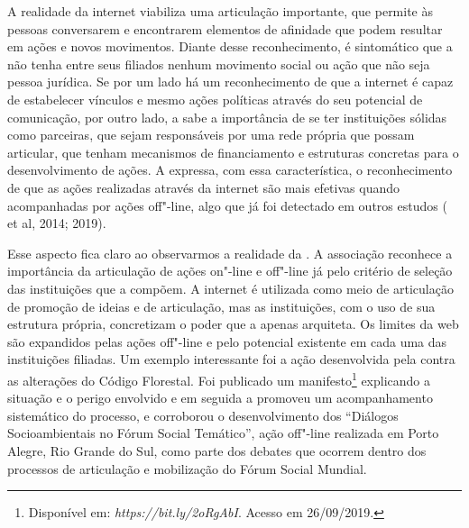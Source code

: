 A realidade da internet viabiliza uma articulação importante, que
permite às pessoas conversarem e encontrarem elementos de afinidade que
podem resultar em ações e novos movimentos. Diante desse reconhecimento,
é sintomático que a  não tenha entre seus filiados nenhum movimento
social ou ação que não seja pessoa jurídica. Se por um lado há um
reconhecimento de que a internet é capaz de estabelecer vínculos e mesmo
ações políticas através do seu potencial de comunicação, por outro lado,
a  sabe a importância de se ter instituições sólidas como
parceiras, que sejam responsáveis por uma rede própria que possam
articular, que tenham mecanismos de financiamento e estruturas concretas
para o desenvolvimento de ações. A  expressa, com essa
característica, o reconhecimento de que as ações realizadas através da
internet são mais efetivas quando acompanhadas por ações off"-line, algo
que já foi detectado em outros estudos ( et al, 2014; 2019).

Esse aspecto fica claro ao observarmos a realidade da . A
associação reconhece a importância da articulação de ações on"-line e
off"-line já pelo critério de seleção das instituições que a compõem. A
internet é utilizada como meio de articulação de promoção de ideias e de
articulação, mas as instituições, com o uso de sua estrutura própria,
concretizam o poder que a  apenas arquiteta. Os limites da web são
expandidos pelas ações off"-line e pelo potencial existente em cada uma
das instituições filiadas. Um exemplo interessante foi a ação
desenvolvida pela  contra as alterações do Código Florestal. Foi
publicado um manifesto\footnote{Disponível em:
  \emph{https://bit.ly/2oRgAbI}.
  Acesso em 26/09/2019.} explicando a situação e o perigo envolvido e em
seguida a  promoveu um acompanhamento sistemático do processo, e
corroborou o desenvolvimento dos ``Diálogos Socioambientais no Fórum
Social Temático'', ação off"-line realizada em Porto Alegre, Rio Grande
do Sul, como parte dos debates que ocorrem dentro dos processos de
articulação e mobilização do Fórum Social Mundial.

